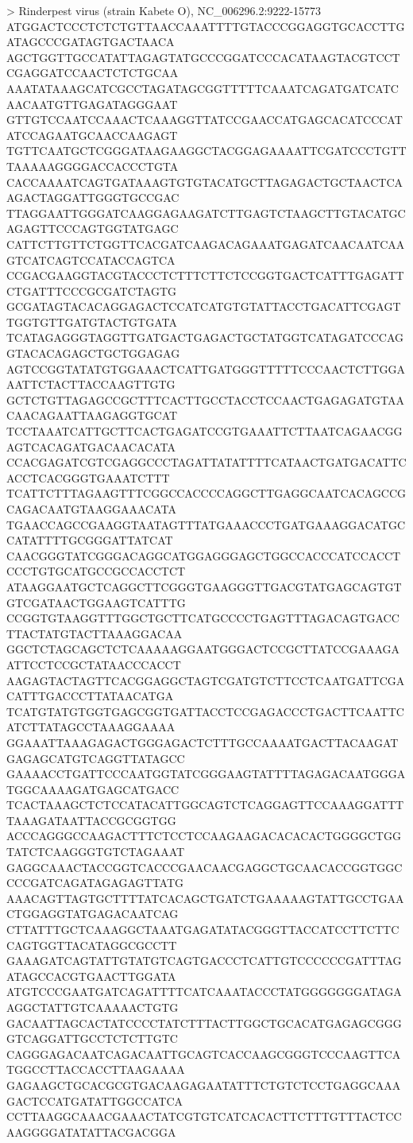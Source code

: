 > Rinderpest virus (strain Kabete O), NC_006296.2:9222-15773
ATGGACTCCCTCTCTGTTAACCAAATTTTGTACCCGGAGGTGCACCTTGATAGCCCGATAGTGACTAACA
AGCTGGTTGCCATATTAGAGTATGCCCGGATCCCACATAAGTACGTCCTCGAGGATCCAACTCTCTGCAA
AAATATAAAGCATCGCCTAGATAGCGGTTTTTCAAATCAGATGATCATCAACAATGTTGAGATAGGGAAT
GTTGTCCAATCCAAACTCAAAGGTTATCCGAACCATGAGCACATCCCATATCCAGAATGCAACCAAGAGT
TGTTCAATGCTCGGGATAAGAAGGCTACGGAGAAAATTCGATCCCTGTTTAAAAAGGGGACCACCCTGTA
CACCAAAATCAGTGATAAAGTGTGTACATGCTTAGAGACTGCTAACTCAAGACTAGGATTGGGTGCCGAC
TTAGGAATTGGGATCAAGGAGAAGATCTTGAGTCTAAGCTTGTACATGCAGAGTTCCCAGTGGTATGAGC
CATTCTTGTTCTGGTTCACGATCAAGACAGAAATGAGATCAACAATCAAGTCATCAGTCCATACCAGTCA
CCGACGAAGGTACGTACCCTCTTTCTTCTCCGGTGACTCATTTGAGATTCTGATTTCCCGCGATCTAGTG
GCGATAGTACACAGGAGACTCCATCATGTGTATTACCTGACATTCGAGTTGGTGTTGATGTACTGTGATA
TCATAGAGGGTAGGTTGATGACTGAGACTGCTATGGTCATAGATCCCAGGTACACAGAGCTGCTGGAGAG
AGTCCGGTATATGTGGAAACTCATTGATGGGTTTTTCCCAACTCTTGGAAATTCTACTTACCAAGTTGTG
GCTCTGTTAGAGCCGCTTTCACTTGCCTACCTCCAACTGAGAGATGTAACAACAGAATTAAGAGGTGCAT
TCCTAAATCATTGCTTCACTGAGATCCGTGAAATTCTTAATCAGAACGGAGTCACAGATGACAACACATA
CCACGAGATCGTCGAGGCCCTAGATTATATTTTCATAACTGATGACATTCACCTCACGGGTGAAATCTTT
TCATTCTTTAGAAGTTTCGGCCACCCCAGGCTTGAGGCAATCACAGCCGCAGACAATGTAAGGAAACATA
TGAACCAGCCGAAGGTAATAGTTTATGAAACCCTGATGAAAGGACATGCCATATTTTGCGGGATTATCAT
CAACGGGTATCGGGACAGGCATGGAGGGAGCTGGCCACCCATCCACCTCCCTGTGCATGCCGCCACCTCT
ATAAGGAATGCTCAGGCTTCGGGTGAAGGGTTGACGTATGAGCAGTGTGTCGATAACTGGAAGTCATTTG
CCGGTGTAAGGTTTGGCTGCTTCATGCCCCTGAGTTTAGACAGTGACCTTACTATGTACTTAAAGGACAA
GGCTCTAGCAGCTCTCAAAAAGGAATGGGACTCCGCTTATCCGAAAGAATTCCTCCGCTATAACCCACCT
AAGAGTACTAGTTCACGGAGGCTAGTCGATGTCTTCCTCAATGATTCGACATTTGACCCTTATAACATGA
TCATGTATGTGGTGAGCGGTGATTACCTCCGAGACCCTGACTTCAATTCATCTTATAGCCTAAAGGAAAA
GGAAATTAAAGAGACTGGGAGACTCTTTGCCAAAATGACTTACAAGATGAGAGCATGTCAGGTTATAGCC
GAAAACCTGATTCCCAATGGTATCGGGAAGTATTTTAGAGACAATGGGATGGCAAAAGATGAGCATGACC
TCACTAAAGCTCTCCATACATTGGCAGTCTCAGGAGTTCCAAAGGATTTTAAAGATAATTACCGCGGTGG
ACCCAGGGCCAAGACTTTCTCCTCCAAGAAGACACACACTGGGGCTGGTATCTCAAGGGTGTCTAGAAAT
GAGGCAAACTACCGGTCACCCGAACAACGAGGCTGCAACACCGGTGGCCCCGATCAGATAGAGAGTTATG
AAACAGTTAGTGCTTTTATCACAGCTGATCTGAAAAAGTATTGCCTGAACTGGAGGTATGAGACAATCAG
CTTATTTGCTCAAAGGCTAAATGAGATATACGGGTTACCATCCTTCTTCCAGTGGTTACATAGGCGCCTT
GAAAGATCAGTATTGTATGTCAGTGACCCTCATTGTCCCCCCGATTTAGATAGCCACGTGAACTTGGATA
ATGTCCCGAATGATCAGATTTTCATCAAATACCCTATGGGGGGGATAGAAGGCTATTGTCAAAAACTGTG
GACAATTAGCACTATCCCCTATCTTTACTTGGCTGCACATGAGAGCGGGGTCAGGATTGCCTCTCTTGTC
CAGGGAGACAATCAGACAATTGCAGTCACCAAGCGGGTCCCAAGTTCATGGCCTTACCACCTTAAGAAAA
GAGAAGCTGCACGCGTGACAAGAGAATATTTCTGTCTCCTGAGGCAAAGACTCCATGATATTGGCCATCA
CCTTAAGGCAAACGAAACTATCGTGTCATCACACTTCTTTGTTTACTCCAAGGGGATATATTACGACGGA
